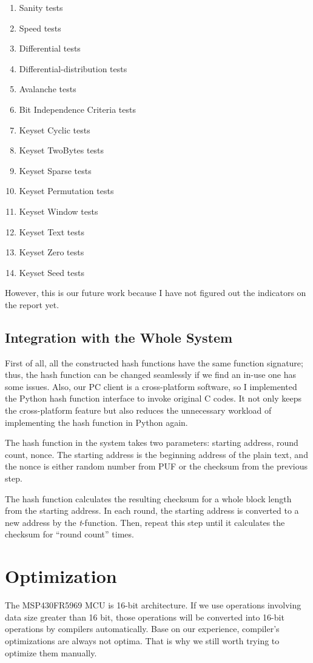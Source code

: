 \documentclass[sigconf, review=false]{acmart}
\begin{document}
\begin{enumerate}
    \item Sanity tests
    \item Speed tests
    \item Differential tests
    \item Differential-distribution tests
    \item Avalanche tests
    \item Bit Independence Criteria tests
    \item Keyset Cyclic tests
    \item Keyset TwoBytes tests
    \item Keyset Sparse tests
    \item Keyset Permutation tests
    \item Keyset Window tests
    \item Keyset Text tests
    \item Keyset Zero tests
    \item Keyset Seed tests
\end{enumerate}

However, this is our future work because I have not figured out the indicators on the report yet.

\subsection{Integration with the Whole System} \label{sec-int}
First of all, all the constructed hash functions have the same function signature; thus, the hash function can be changed seamlessly if we find an in-use one has some issues.
Also, our PC client is a cross-platform software, so I implemented the Python hash function interface to invoke original C codes.
It not only keeps the cross-platform feature but also reduces the unnecessary workload of implementing the hash function in Python again.

The hash function in the system takes two parameters: starting address, round count, nonce.
The starting address is the beginning address of the plain text, and the nonce is either random number from PUF or the checksum from the previous step.

The hash function calculates the resulting checksum for a whole block length from the starting address.
In each round, the starting address is converted to a new address by the \textit{t}-function.
Then, repeat this step until it calculates the checksum for ``round count'' times.


\section{Optimization}
The MSP430FR5969 MCU is 16-bit architecture.
If we use operations involving data size greater than 16 bit, those operations will be converted into 16-bit operations by compilers automatically.
Base on our experience, compiler's optimizations are always not optima.
That is why we still worth trying to optimize them manually.
\end{document}
